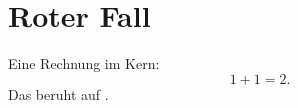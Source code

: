\chapter{Roter Fall}\label{c99}

Eine Rechnung im Kern:
\begin{equation}\label{c99.eq.eins}
  1 + 1 = 2.
\end{equation}
Das beruht auf .

